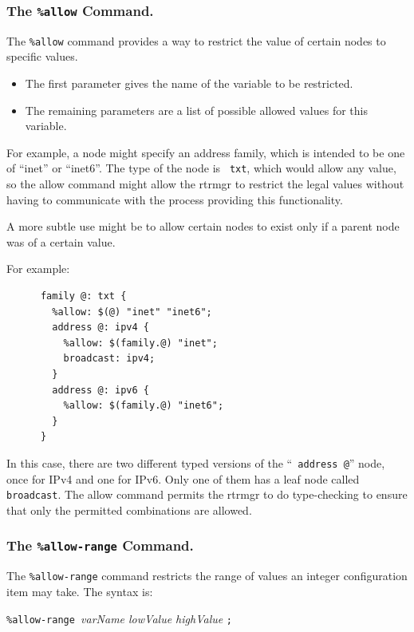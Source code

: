 \documentclass[11pt]{article}
\begin{document}
\subsubsection{The {\tt \%allow} Command.}
The {\tt \%allow} command provides a way to restrict the value of
certain nodes to specific values.

\begin{itemize}

  \item The first parameter gives the name of the variable to be restricted.

  \item The remaining parameters are a list of possible allowed values for
this variable.

\end{itemize}

For example, a node might specify an address family, which is intended
to be one of ``inet'' or ``inet6''.  The type of the node is {\tt
txt}, which would allow any value, so the allow command might allow
the rtrmgr to restrict the legal values without having to
communicate with the process providing this functionality.

A more subtle use might be to allow certain nodes to exist only if a
parent node was of a certain value.

For example:

\begin{verbatim}
      family @: txt {
        %allow: $(@) "inet" "inet6";
        address @: ipv4 {
          %allow: $(family.@) "inet";
          broadcast: ipv4;
        }
        address @: ipv6 {
          %allow: $(family.@) "inet6";
        }
      }
\end{verbatim}

In this case, there are two different typed versions of the ``{\tt
address @}'' node, once for IPv4 and one for IPv6.  Only one of them has
a leaf node called {\tt broadcast}.  The allow command permits the
rtrmgr to do type-checking to ensure that only the permitted
combinations are allowed.

\subsubsection{The {\tt \%allow-range} Command.}

The {\tt \%allow-range} command restricts the range of values an
integer configuration item may take.  The syntax is:

\texttt{\%allow-range }{\it varName lowValue highValue} \texttt{;}
\end{document}
